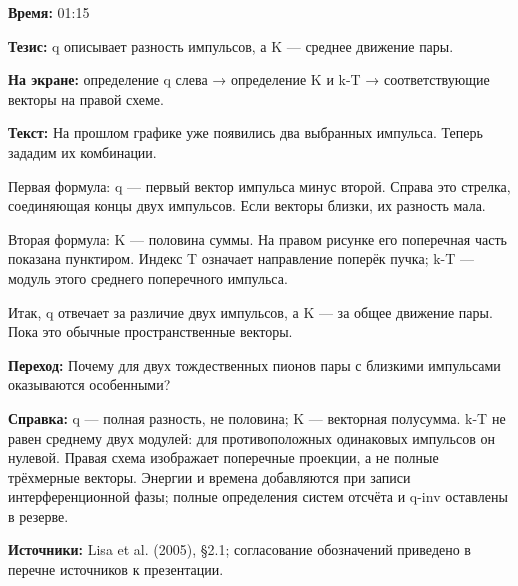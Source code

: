 \textbf{Время:} 01:15

\textbf{Тезис:} q описывает разность импульсов, а K — среднее движение пары.

\textbf{На экране:} определение q слева → определение K и k-T → соответствующие векторы на правой схеме.

\textbf{Текст:} На прошлом графике уже появились два выбранных импульса. Теперь зададим их комбинации.

Первая формула: q — первый вектор импульса минус второй. Справа это стрелка, соединяющая концы двух импульсов. Если векторы близки, их разность мала.

Вторая формула: K — половина суммы. На правом рисунке его поперечная часть показана пунктиром. Индекс T означает направление поперёк пучка; k-T — модуль этого среднего поперечного импульса.

Итак, q отвечает за различие двух импульсов, а K — за общее движение пары. Пока это обычные пространственные векторы.

\textbf{Переход:} Почему для двух тождественных пионов пары с близкими импульсами оказываются особенными?

\textbf{Справка:} q — полная разность, не половина; K — векторная полусумма. k-T не равен среднему двух модулей: для противоположных одинаковых импульсов он нулевой. Правая схема изображает поперечные проекции, а не полные трёхмерные векторы. Энергии и времена добавляются при записи интерференционной фазы; полные определения систем отсчёта и q-inv оставлены в резерве.

\textbf{Источники:} Lisa et al. (2005), §2.1; согласование обозначений приведено в перечне источников к презентации.
